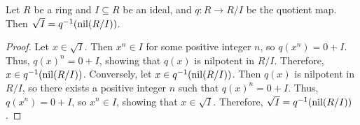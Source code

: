 \begin{proposition}
    Let $R$ be a ring and $I \subseteq R$ be an ideal, and $q: R \to R/I$ be the quotient map. Then $\sqrt{I} = q^{-1}(\operatorname{nil}(R/I))$.
\end{proposition}
\begin{proof}
    Let $x \in \sqrt{I}$. Then $x^n \in I$ for some positive integer $n$, so $q(x^n) = 0 + I$. Thus, $q(x)^n = 0 + I$, showing that $q(x)$ is nilpotent in $R/I$. Therefore, $x \in q^{-1}(\operatorname{nil}(R/I))$. Conversely, let $x \in q^{-1}(\operatorname{nil}(R/I))$. Then $q(x)$ is nilpotent in $R/I$, so there exists a positive integer $n$ such that $q(x)^n = 0 + I$. Thus, $q(x^n) = 0 + I$, so $x^n \in I$, showing that $x \in \sqrt{I}$. Therefore, $\sqrt{I} = q^{-1}(\operatorname{nil}(R/I))$.
\end{proof}